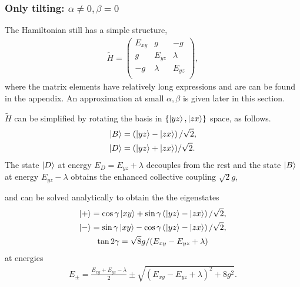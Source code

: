 \documentclass[a4paper,prb]{revtex4-1}  %
\newcommand{\com}[1]{}
\begin{document}
\subsubsection{Only tilting: $\alpha\neq 0,\beta = 0$}



The Hamiltonian still has a simple structure, 
\begin{align} 
\tilde H = 
\left(
\begin{array}{ccc}
 E_{xy} & g & -g \\
 g & E_{yz} & \lambda  \\
 -g & \lambda  & E_{yz} \\
\end{array}
\right),
\end{align}
where the matrix elements have relatively long expressions and are can be found in the appendix. An approximation at small $\alpha,\beta$ is given later in this section. 



$\tilde H$ can be simplified by rotating the basis in $\{\ket{yz},\ket{zx}\}$ space,
as follows.
\begin{align}
\ket{B} &= \left(\ket{yz} - \ket{zx}\right)/\sqrt{2},\\
\ket{D} &=  (\ket{yz} + \ket{zx})/\sqrt{2}.
\end{align}
The state $\ket{D}$ at energy ${E_D= E_{yz}+\lambda}$ decouples 
from the rest and the state $\ket{B}$ at energy ${E_{yz}-\lambda}$ obtains the enhanced collective coupling $\sqrt{2} g$, 
\com{
\begin{align}
\tilde H_{Bright} = 
\left(
\begin{array}{cc}
E_{xy} & \sqrt{2} g \\
\sqrt{2} g & E_{yz}-\lambda
\end{array}
\right).
\end{align}
The Hamiltonian can be solved analytically.
}
and can be solved analytically to
obtain the 
the eigenstates
\begin{gather}
\ket{+} = \cos\gamma \ket{xy} + \sin\gamma \left(\ket{yz} - \ket{zx}\right)/\sqrt{2},\\
\ket{-} = \sin\gamma \ket{xy} - \cos\gamma \left(\ket{yz} - \ket{zx}\right)/\sqrt{2},\\
\tan2\gamma = \sqrt{8}g/(E_{xy}-E_{yz}+\lambda)
\end{gather}
at 
energies
\begin{gather}
E_{\pm} = \frac{E_{xy}+E_{yz}-\lambda}{2}  \pm \sqrt{(E_{xy}-E_{yz}+\lambda)^2 + 8g^2 }.
\end{gather}
\end{document}
